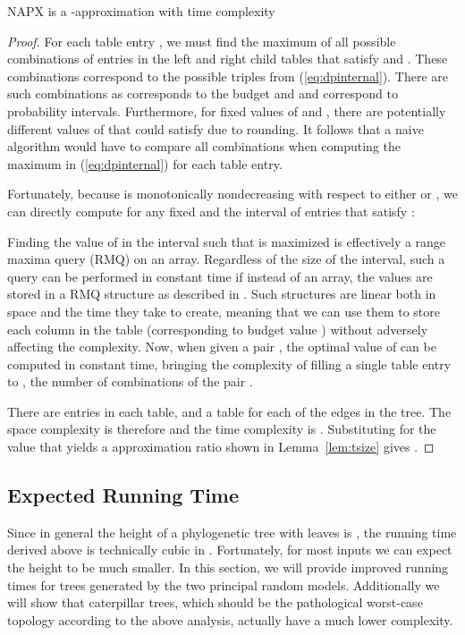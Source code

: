 \documentclass[10pt]{llncs}       \usepackage{graphicx,subfigure}
\begin{document}
\begin{theorem}
  \label{thm:ptas}
NAPX is a -approximation with time complexity

\end{theorem}
\begin{proof}
For each table entry , we must find the maximum
of all possible combinations of
entries in the left and right child tables that satisfy  and .  These
combinations correspond to the possible  triples from 
 (\ref{eq:dpinternal}).  There are  such combinations as  
corresponds to the budget and  and  correspond to probability intervals.
Furthermore, for fixed values of  and , there are potentially 
 different values of  that could satisfy  due to
rounding. It follows that a naive algorithm would have to compare all
 combinations when computing the maximum in (\ref{eq:dpinternal})
for each table entry. 

Fortunately, because  is 
monotonically nondecreasing with respect to either
 or , we can directly compute for any fixed  and  the
interval of  entries that satisfy :

Finding the value of  in the interval such that  is maximized
is effectively a range maxima query (RMQ) on an array. Regardless of the size 
of the interval, such a query can be performed in constant time if instead
of an array, the values are stored in a RMQ structure as described in 
\cite{bender00}.  Such structures are linear both in space and the time they
take to create, meaning that we can use them to store each column in the table 
(corresponding to budget value ) without adversely affecting the complexity.
Now, when given a pair , the optimal value of  can be computed in
constant time, bringing the complexity of filling a single table entry to
, the number of combinations of the pair .   

There are  entries in each table, and a table for each of the 
edges in the tree. The space complexity is therefore  and the time
complexity is . Substituting  for the value that yields
a  approximation ratio shown in
Lemma~\ref{lem:tsize} gives
.

\end{proof}

\subsection{Expected Running Time}

Since in general
 the height of a phylogenetic tree with  leaves is , the running
time derived above is technically cubic in .  Fortunately, for most 
inputs we can expect the height to be much smaller.  In this section, we
will provide improved running times for trees generated by the two principal
random models.  Additionally we will show that caterpillar trees, which
should be the pathological worst-case topology according to the 
above analysis, actually have a much lower complexity.
\end{document}
